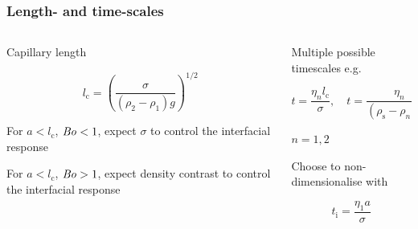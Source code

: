 \documentclass{beamer}
\newcommand\Bo{\mbox{\textit{Bo}}}  %
\begin{document}
\begin{frame}
  \frametitle{Length- and time-scales}

  \begin{columns}

    \begin{column}{0.5\paperwidth}
      \centering

      Capillary length 

      \begin{equation}
        l_{\text{c}} = \left(\frac{\sigma}{(\rho_{2} - \rho_{1}) g}\right)^{1/2} \nonumber
      \end{equation}

      \vspace{1cm}

      For $a < l_{\text{c}}$, $\Bo < 1$, expect $\sigma$ to control the interfacial response

      \vspace{1cm}

      For $a < l_{\text{c}}$, $\Bo > 1$, expect density contrast to control the interfacial response

    \end{column}

    \begin{column}{0.5\paperwidth}
      \centering

      Multiple possible timescales e.g.

      \begin{equation}
        t = \frac{\eta_{n} l_{\text{c}}}{\sigma}, \quad t = \frac{\eta_{n}}{(\rho_{\text{s}} - \rho_{n}) g a}, \nonumber
      \end{equation}

      $n = 1,2$

      \vspace{1cm}

      Choose to non-dimensionalise with

      \begin{equation}
        t_{\text{i}} = \frac{\eta_{1} a}{\sigma} \nonumber
      \end{equation}
    \end{column}

  \end{columns}

\end{frame}

\end{document}
